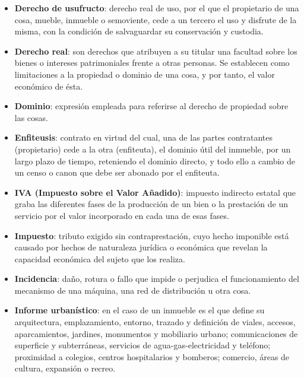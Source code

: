 \documentclass[10pt,a4paper]{article}
\begin{document}
{\begin{itemize}
\begin{itemize}
\item Cuota fija o constante: ésta es más frecuente y consiste en que el importe de los intereses se van reduciendo en una cuantía proporcional a la amortización del capital.
\item Cuota creciente: en este caso va aumentando cada año un porcentaje prefijado. Tiene la ventaja de que se paga menos al principio, pero lógicamente la carga aumenta en el futuro. Su inconveniente es que pagan más intereses.
\end{itemize}
\item \textbf{Derecho de usufructo}: derecho real de uso, por el que el propietario de una cosa, mueble, inmueble o semoviente, cede a un tercero el uso y disfrute de la misma, con la condición de salvaguardar su conservación y custodia.
\item \textbf{Derecho real}: son derechos que atribuyen a su titular una facultad sobre los bienes o intereses patrimoniales frente a otras personas. Se establecen como limitaciones a la propiedad o dominio de una cosa, y por tanto, el valor económico de ésta.
\item \textbf{Dominio}: expresión empleada para referirse al derecho de propiedad sobre las cosas.
\item \textbf{Enfiteusis}: contrato en virtud del cual, una de las partes contratantes (propietario) cede a la otra (enfiteuta), el dominio útil del inmueble, por un largo plazo de tiempo, reteniendo el dominio directo, y todo ello a cambio de un censo o canon que debe ser abonado por el enfiteuta.
\item \textbf{IVA (Impuesto sobre el Valor Añadido)}: impuesto indirecto estatal que graba las diferentes fases de la producción de un bien o la prestación de un servicio por el valor incorporado en cada una de esas fases.
\item \textbf{Impuesto}: tributo exigido sin contraprestación, cuyo hecho imponible está causado por hechos de naturaleza jurídica o económica que revelan la capacidad económica del sujeto que los realiza.
\item \textbf{Incidencia}: daño, rotura o fallo que impide o perjudica el funcionamiento del mecanismo de una máquina, una red de distribución u otra cosa.
\item \textbf{Informe urbanístico}: en el caso de un inmueble es el que define su arquitectura, emplazamiento, entorno, trazado y definición de viales, accesos, aparcamientos, jardines, monumentos y mobiliario urbano; comunicaciones de superficie y subterráneas, servicios de agua-gas-electricidad y teléfono; proximidad a colegios, centros hospitalarios y bomberos; comercio, áreas de cultura, expansión o recreo.

\end{itemize}}
\end{document}
